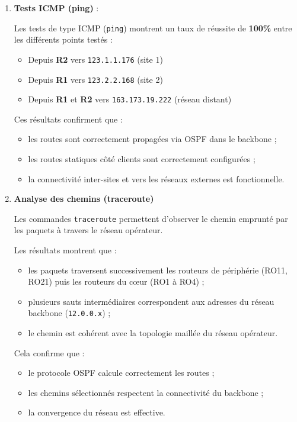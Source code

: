 \documentclass[12pt,a4paper, oneside]{memoir}
\begin{document}
\begin{enumerate}
	\item \textbf{Tests ICMP (ping)} : 
	
	Les tests de type ICMP (\texttt{ping}) montrent un taux de réussite de \textbf{100\%} entre les différents points testés :
	
	\begin{itemize}
		\item Depuis \textbf{R2} vers \texttt{123.1.1.176} (site 1)
		\item Depuis \textbf{R1} vers \texttt{123.2.2.168} (site 2)
		\item Depuis \textbf{R1} et \textbf{R2} vers \texttt{163.173.19.222} (réseau distant)
	\end{itemize}
	
	Ces résultats confirment que :
	\begin{itemize}
		\item les routes sont correctement propagées via OSPF dans le backbone ;
		\item les routes statiques côté clients sont correctement configurées ;
		\item la connectivité inter-sites et vers les réseaux externes est fonctionnelle.
	\end{itemize}
	
	\item \textbf{Analyse des chemins (traceroute)}
	
	Les commandes \texttt{traceroute} permettent d’observer le chemin emprunté par les paquets à travers le réseau opérateur.
	
	Les résultats montrent que :
	\begin{itemize}
		\item les paquets traversent successivement les routeurs de périphérie (RO11, RO21) puis les routeurs du cœur (RO1 à RO4) ;
		\item plusieurs sauts intermédiaires correspondent aux adresses du réseau backbone (\texttt{12.0.0.x}) ;
		\item le chemin est cohérent avec la topologie maillée du réseau opérateur.
	\end{itemize}
	
	Cela confirme que :
	\begin{itemize}
		\item le protocole OSPF calcule correctement les routes ;
		\item les chemins sélectionnés respectent la connectivité du backbone ;
		\item la convergence du réseau est effective.
	\end{itemize}
	

\end{enumerate}
\end{document}
